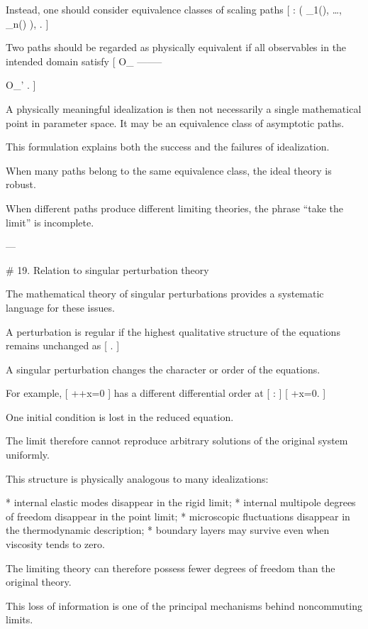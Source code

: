 Instead, one should consider equivalence classes of scaling paths
[
\gamma:
\epsilon
\mapsto
\left(
\lambda_1(\epsilon),
\ldots,
\lambda_n(\epsilon)
\right),
\qquad
\epsilon{}.
]

Two paths should be regarded as physically equivalent if all observables in the intended domain satisfy
[
O_\gamma
--------

O_{\gamma'}
.
]

A physically meaningful idealization is then not necessarily a single mathematical point in parameter space. It may be an equivalence class of asymptotic paths.

This formulation explains both the success and the failures of idealization.

When many paths belong to the same equivalence class, the ideal theory is robust.

When different paths produce different limiting theories, the phrase ``take the limit'' is incomplete.

---

# 19. Relation to singular perturbation theory

The mathematical theory of singular perturbations provides a systematic language for these issues.

A perturbation is regular if the highest qualitative structure of the equations remains unchanged as
[
\epsilon{}.
]

A singular perturbation changes the character or order of the equations.

For example,
[
\epsilon {}++x=0
]
has a different differential order at
[
:
]
[
+x=0.
]

One initial condition is lost in the reduced equation.

The limit therefore cannot reproduce arbitrary solutions of the original system uniformly.

This structure is physically analogous to many idealizations:

* internal elastic modes disappear in the rigid limit;
* internal multipole degrees of freedom disappear in the point limit;
* microscopic fluctuations disappear in the thermodynamic description;
* boundary layers may survive even when viscosity tends to zero.

The limiting theory can therefore possess fewer degrees of freedom than the original theory.

This loss of information is one of the principal mechanisms behind noncommuting limits.

